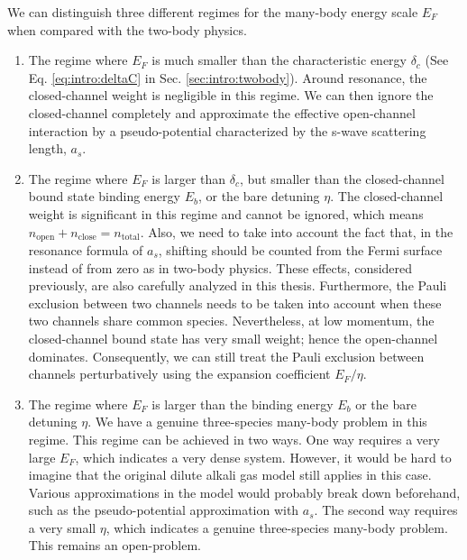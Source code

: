 We can distinguish three different regimes for the many-body energy scale $E_F$ when compared with the two-body physics.  
\begin{enumerate}
\item The regime where $E_F$ is much smaller than the characteristic energy $\delta_c$ (See Eq. \ref{eq:intro:deltaC} in Sec. \ref{sec:intro:twobody}). Around resonance, the closed-channel weight is negligible in this regime. We can then ignore the closed-channel completely and approximate the effective open-channel interaction by a  pseudo-potential characterized by the s-wave scattering length, $a_s$. 
\item The regime where  $E_F$ is larger than $\delta_c$, but smaller than the closed-channel bound state binding energy $E_b$, or the bare detuning $\eta$.  The closed-channel weight is significant in this regime and cannot be ignored, which means $n_{\text{open}}+n_{\text{close}}=n_{\text{total}}$. Also, we need to take into account the fact that, in the resonance formula of $a_s$, shifting should be counted from the Fermi surface instead of from zero as in two-body physics.    These effects, considered previously\cite{GurarieNarrow}, are  also carefully analyzed in this thesis.  Furthermore, the Pauli exclusion between two channels needs to be taken into account when these two channels share common species.  Nevertheless, at  low momentum, the closed-channel bound state has very small weight;  hence the open-channel dominates.  Consequently, we can still treat the Pauli exclusion between channels perturbatively using the expansion coefficient  $E_F/\eta$. 
\item The regime where  $E_F$ is larger than the binding energy $E_b$ or the bare detuning $\eta$. We have a genuine three-species many-body problem in this regime. This regime can be achieved in two ways.  One way requires a very large $E_F$, which indicates a very dense system.  However, it would be hard to imagine that  the original dilute alkali gas model still applies in this case. Various approximations in the model would probably break down beforehand, such as the pseudo-potential approximation with $a_s$. The second way requires a very small $\eta$, which indicates a genuine three-species many-body problem.  This remains an open-problem.   
\end{enumerate}
 

 



